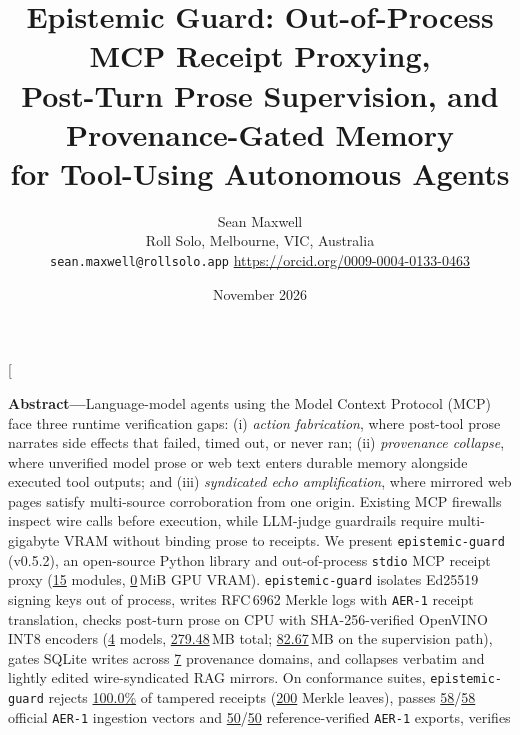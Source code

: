 \documentclass[10pt,twocolumn]{article}
\title{\Large\textbf{Epistemic Guard: Out-of-Process MCP Receipt Proxying,\\
Post-Turn Prose Supervision, and Provenance-Gated Memory\\
for Tool-Using Autonomous Agents}}
\author{
  Sean Maxwell\\
  Roll Solo, Melbourne, VIC, Australia\\
  \texttt{sean.maxwell@rollsolo.app} \quad
  \url{https://orcid.org/0009-0004-0133-0463}
}
\date{November 2026}
\begin{document}
\twocolumn[
\begin{@twocolumnfalse}
\vspace{-1.8em}
\maketitle
\vspace{-1.2em}
\begin{center}
\begin{minipage}{0.94\textwidth}
\small
\noindent\textbf{Abstract---}Language-model agents using the Model Context Protocol (MCP) face three runtime verification gaps: (i) \emph{action fabrication}, where post-tool prose narrates side effects that failed, timed out, or never ran; (ii) \emph{provenance collapse}, where unverified model prose or web text enters durable memory alongside executed tool outputs; and (iii) \emph{syndicated echo amplification}, where mirrored web pages satisfy multi-source corroboration from one origin. Existing MCP firewalls inspect wire calls before execution, while LLM-judge guardrails require multi-gigabyte VRAM without binding prose to receipts. We present \texttt{epistemic-guard} (v0.5.2), an open-source Python library and out-of-process \texttt{stdio} MCP receipt proxy (\href{https://github.com/AlienatedAliens/epistemic-guard/blob/v0.5.2/results/table1_architecture.json\#L30}{15} modules, \href{https://github.com/AlienatedAliens/epistemic-guard/blob/v0.5.2/results/table3_heldout_supervision.json\#L84}{0}\,MiB GPU VRAM). \texttt{epistemic-guard} isolates Ed25519 signing keys out of process, writes RFC\,6962 Merkle logs with \texttt{AER-1} receipt translation, checks post-turn prose on CPU with SHA-256-verified OpenVINO INT8 encoders (\href{https://github.com/AlienatedAliens/epistemic-guard/blob/v0.5.2/results/table1_architecture.json\#L16}{4} models, \href{https://github.com/AlienatedAliens/epistemic-guard/blob/v0.5.2/results/table1_architecture.json\#L34}{279.48}\,MB total; \href{https://github.com/AlienatedAliens/epistemic-guard/blob/v0.5.2/results/table1_architecture.json\#L19}{82.67}\,MB on the supervision path), gates SQLite writes across \href{https://github.com/AlienatedAliens/epistemic-guard/blob/v0.5.2/results/table1_architecture.json\#L28}{7} provenance domains, and collapses verbatim and lightly edited wire-syndicated RAG mirrors. On conformance suites, \texttt{epistemic-guard} rejects \href{https://github.com/AlienatedAliens/epistemic-guard/blob/v0.5.2/results/table2_conformance.json\#L44}{100.0\%} of tampered receipts (\href{https://github.com/AlienatedAliens/epistemic-guard/blob/v0.5.2/results/table2_conformance.json\#L43}{200} Merkle leaves), passes \href{https://github.com/AlienatedAliens/epistemic-guard/blob/v0.5.2/results/table2_conformance.json\#L18}{58}/\href{https://github.com/AlienatedAliens/epistemic-guard/blob/v0.5.2/results/table2_conformance.json\#L21}{58} official \texttt{AER-1} ingestion vectors and \href{https://github.com/AlienatedAliens/epistemic-guard/blob/v0.5.2/results/table2_conformance.json\#L22}{50}/\href{https://github.com/AlienatedAliens/epistemic-guard/blob/v0.5.2/results/table2_conformance.json\#L14}{50} reference-verified \texttt{AER-1} exports, verifies 
\end{minipage}
\end{center}
\end{@twocolumnfalse}
\end{document}
